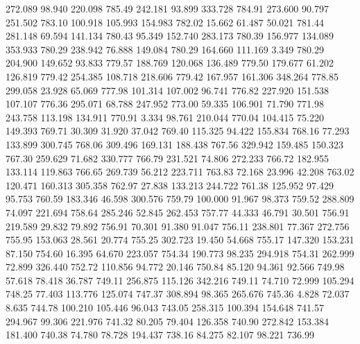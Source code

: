  272.089   98.940  220.098       785.49
 242.181   93.899  333.728       784.91
 273.600   90.797  251.502       783.10
 100.918  105.993  154.983       782.02
  15.662   61.487   50.021       781.44
 281.148   69.594  141.134       780.43
  95.349  152.740  283.173       780.39
 156.977  134.089  353.933       780.29
 238.942   76.888  149.084       780.29
 164.660  111.169    3.349       780.29
 204.900  149.652   93.833       779.57
 188.769  120.068  136.489       779.50
 179.677   61.202  126.819       779.42
 254.385  108.718  218.606       779.42
 167.957  161.306  348.264       778.85
 299.058   23.928   65.069       777.98
 101.314  107.002   96.741       776.82
 227.920  151.538  107.107       776.36
 295.071   68.788  247.952       773.00
  59.335  106.901   71.790       771.98
 243.758  113.198  134.911       770.91
   3.334   98.761  210.044       770.04
 104.415   75.220  149.393       769.71
  30.309   31.920   37.042       769.40
 115.325   94.422  155.834       768.16
  77.293  133.899  300.745       768.06
 309.496  169.131  188.438       767.56
 329.942  159.485  150.323       767.30
 259.629   71.682  330.777       766.79
 231.521   74.806  272.233       766.72
 182.955  133.114  119.863       766.65
 269.739   56.212  223.711       763.83
  72.168   23.996   42.208       763.02
 120.471  160.313  305.358       762.97
  27.838  133.213  244.722       761.38
 125.952   97.429   95.753       760.59
 183.346   46.598  300.576       759.79
 100.000   91.967   98.373       759.52
 288.809   74.097  221.694       758.64
 285.246   52.845  262.453       757.77
  44.333   46.791   30.501       756.91
 219.589   29.832   79.892       756.91
  70.301   91.380   91.047       756.11
 238.801   77.367  272.756       755.95
 153.063   28.561   20.774       755.25
 302.723   19.450   54.668       755.17
 147.320  153.231   87.150       754.60
  16.395   64.670  223.057       754.34
 190.773   98.235  294.918       754.31
 262.999   72.899  326.440       752.72
 110.856   94.772   20.146       750.84
  85.120   94.361   92.566       749.98
  57.618   78.418   36.787       749.11
 256.875  115.126  342.216       749.11
  74.710   72.999  105.294       748.25
  77.403  113.776  125.074       747.37
 308.894   98.365  265.676       745.36
   4.828   72.037    8.635       744.78
 100.210  105.446   96.043       743.05
 258.315  100.394  154.648       741.57
 294.967   99.306  221.976       741.32
  80.205   79.404  126.358       740.90
 272.842  153.384  181.400       740.38
  74.780   78.728  194.437       738.16
  84.275   82.107   98.221       736.99
